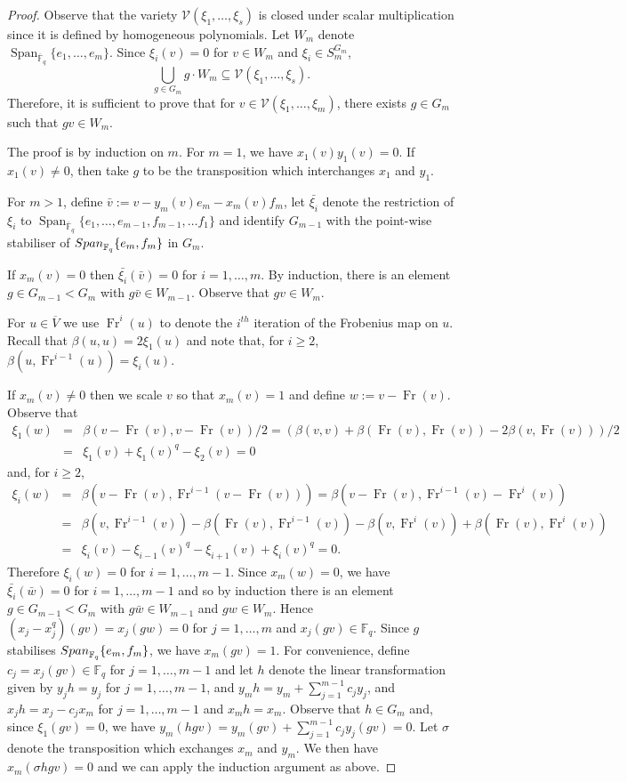 \documentclass[10pt,a4paper]{amsart}
\DeclareMathOperator{\Fr}{Fr}
\DeclareMathOperator{\Span}{Span}
\newcommand{\V}{\mathcal{V}}
\newcommand{\field}{\mathbb{F}}
\newcommand{\invring}{S_m^{G_m}}
\begin{document}
\begin{proof} 
Observe that the variety $\V(\xi_1,\ldots,\xi_s)$ is closed under scalar multiplication 
since it is defined by homogeneous polynomials.
Let $W_m$ denote 
$\Span_{\overline{\field}_q}\{e_1,\ldots,e_m\}$.
Since $\xi_{i}(v)=0$ for $v\in W_m$ and $\xi_{i}\in \invring$, 
$$\bigcup_{g\in G_m}g\cdot W_m\subseteq \V(\xi_1,\ldots,\xi_s).$$ 
Therefore, it is sufficient to prove that for 
$v\in \V( \xi_1,\ldots,\xi_{m})$, there exists $g\in G_m$ such that
$gv\in W_m$.

The proof is by induction on $m$. For $m=1$, we have $x_1(v)y_1(v)=0$. If $x_1(v)\not=0$, then take $g$ to be the transposition which interchanges $x_1$ and $y_1$.

For $m>1$, define $\bar{v}:=v-y_m(v)e_m-x_m(v)f_m$, let
$\bar{\xi_{i}}$ denote the restriction of $\xi_{i}$ to 
$\Span_{\overline{\field}_q}\{e_1,\ldots,e_{m-1},f_{m-1},\ldots f_1\}$  and
identify $G_{m-1}$ with the point-wise stabiliser of  
${\rm Span}_{\field_q}\{e_m,f_m\}$ in $G_m$.

If $x_m(v)=0$ then $\bar{\xi_{i}}(\bar{v})=0$ for $i=1,\ldots,m$.
By induction, there is an element $g\in G_{m-1}< G_m$
with $g\bar{v}\in W_{m-1}$. Observe that 
$gv\in W_m$.


For $u\in \overline{V}$ we use $\Fr^i(u)$ to denote the $i^{th}$ iteration of the Frobenius map on $u$.
Recall that $\beta(u,u)=2\xi_1(u)$ and note that, for $i\geq2$,
$\beta(u,\Fr^{i-1}(u))=\xi_{i}(u)$.

If $x_m(v)\not=0$ then we scale $v$ so that $x_m(v)=1$ and define $w:=v-\Fr(v)$.
Observe that
\begin{eqnarray*}
\xi_1(w)&=&
\beta(v-\Fr(v),v-\Fr(v))/2
=\left(\beta(v,v)+\beta(\Fr(v),\Fr(v))-2\beta(v,\Fr(v))\right)/2\\
   &=&\xi_1(v)+\xi_1(v)^q-\xi_2(v)=0
\end {eqnarray*}
and, for $i\geq2$,
\begin{eqnarray*}
\xi_{i}(w)&=&\beta(v-\Fr(v),\Fr^{i-1}(v-\Fr(v)))=\beta(v-\Fr(v),\Fr^{i-1}(v)-\Fr^{i}(v))\\
&=&\beta(v,\Fr^{i-1}(v))-\beta(\Fr(v),\Fr^{i-1}(v))-\beta(v,\Fr^{i}(v))+\beta(\Fr(v),\Fr^{i}(v))\\
   &=&\xi_{i}(v)-\xi_{i-1}(v)^q-\xi_{i+1}(v)+\xi_{i}(v)^q=0.
\end {eqnarray*}
Therefore $\xi_{i}(w)=0$ for $i=1,\ldots,m-1$.
Since $x_m(w)=0$,
we have $\bar{\xi_{i}}(\bar{w})=0$ for $i=1,\ldots, m-1$ and so by induction
there is an element $g\in G_{m-1}<G_m$
with $g\bar{w}\in W_{m-1}$ and $gw\in W_m$.
Hence $(x_j-x_j^q)(gv)=x_j(gw)=0$ for $j=1,\ldots,m$ and $x_j(gv)\in\field_q$.
Since $g$ stabilises ${\rm Span}_{\field_q}\{e_m,f_m\}$, we have $x_m(gv)=1$.
For convenience, define $c_j=x_j(gv)\in\field_q$ for $j=1,\ldots,m-1$ and
let $h$ denote the linear transformation
given by $y_jh=y_j$ for $j=1,\ldots,m-1$, 
and $y_mh=y_m+\sum_{j=1}^{m-1} c_jy_j$, and $x_jh=x_j-c_jx_m$ for $j=1,\ldots,m-1$
and $x_mh=x_m$. Observe that $h\in G_m$
and, since  $\xi_1(gv)=0$, we have $y_m(hgv)=y_m(gv)+\sum_{j=1}^{m-1} c_jy_j(gv)=0$.
Let $\sigma $ denote the transposition which exchanges $x_m$ and $y_m$. We then have
$x_m(\sigma h g v)=0$ and we can apply the induction argument as above.
\end{proof}
\end{document}
